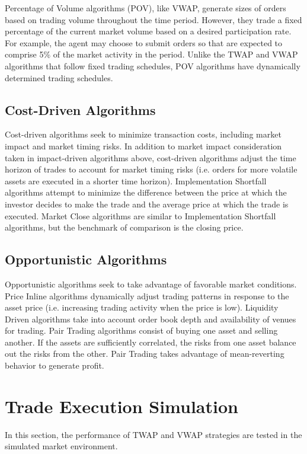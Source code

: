 Percentage of Volume algorithms (POV), like VWAP, generate sizes of orders based on trading volume throughout the time period. However, they trade a fixed percentage of the current market volume based on a desired participation rate. For example, the agent may choose to submit orders so that are expected to comprise 5\% of the market activity in the period. Unlike the TWAP and VWAP algorithms that follow fixed trading schedules, POV algorithms have dynamically determined trading schedules.

\subsection{Cost-Driven Algorithms}
Cost-driven algorithms seek to minimize transaction costs, including market impact and market timing risks. In addition to market impact consideration taken in impact-driven algorithms above, cost-driven algorithms adjust the time horizon of trades to account for market timing risks (i.e. orders for more volatile assets are executed in a shorter time horizon). Implementation Shortfall algorithms attempt to minimize the difference between the price at which the investor decides to make the trade and the average price at which the trade is executed. Market Close algorithms are similar to Implementation Shortfall algorithms, but the benchmark of comparison is the closing price.

\subsection{Opportunistic Algorithms}
Opportunistic algorithms seek to take advantage of favorable market conditions. Price Inline algorithms dynamically adjust trading patterns in response to the asset price (i.e. increasing trading activity when the price is low). Liquidity Driven algorithms take into account order book depth and availability of venues for trading. Pair Trading algorithms consist of buying one asset and selling another. If the assets are sufficiently correlated, the risks from one asset balance out the risks from the other. Pair Trading takes advantage of mean-reverting behavior to generate profit.


\section{Trade Execution Simulation} \label{ch:sim_results}
In this section, the performance of TWAP and VWAP strategies are tested in the simulated market environment.
